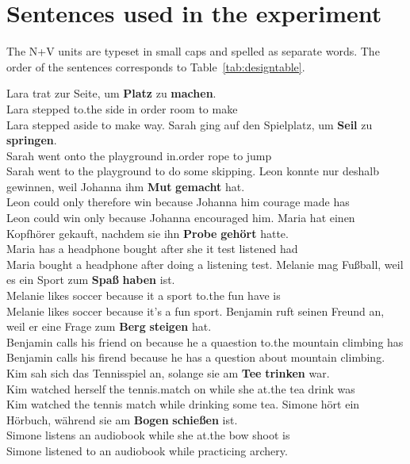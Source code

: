 \documentclass[biblatex, charis, linguex]{glossa}\usepackage{knitr}
\begin{document}


\appendix


\section{Sentences used in the experiment}
\label{sec:sentencesusedintheexperiment}

The N+V units are typeset in small caps and spelled as separate words.
The order of the sentences corresponds to Table~\ref{tab:designtable}.

\begin{exe}
  \ex\gll Lara trat zur Seite, um \textbf{Platz} zu \textbf{machen}.\\
  Lara stepped {to.the} side {in order} room to make\\
  \trans Lara stepped aside to make way.
  \ex\gll Sarah ging auf den Spielplatz, um \textbf{Seil} zu \textbf{springen}.\\
  Sarah went onto the playground {in.order} rope to jump\\
  \trans Sarah went to the playground to do some skipping.
  \ex\gll Leon konnte nur deshalb gewinnen, weil Johanna ihm \textbf{Mut} \textbf{gemacht} hat.\\
  Leon could only therefore win because Johanna him courage made has\\
  \trans Leon could win only because Johanna encouraged him.
  \ex\gll Maria hat einen Kopfhörer gekauft, nachdem sie ihn \textbf{Probe} \textbf{gehört} hatte.\\
  Maria has a headphone bought after she it test listened had\\
  \trans Maria bought a headphone after doing a listening test.
  \ex\gll Melanie mag Fußball, weil es ein Sport zum \textbf{Spaß} \textbf{haben} ist.\\
  Melanie likes soccer because it a sport {to.the} fun have is\\
  \trans Melanie likes soccer because it's a fun sport.
  \ex\gll Benjamin ruft seinen Freund an, weil er eine Frage zum \textbf{Berg} \textbf{steigen} hat.\\
  Benjamin calls his friend on because he a quaestion {to.the} mountain climbing has\\
  \trans Benjamin calls his firend because he has a question about mountain climbing.
  \ex\gll Kim sah sich das Tennisspiel an, solange sie am \textbf{Tee} \textbf{trinken} war.\\
  Kim watched herself the {tennis.match} on while she {at.the} tea drink was\\
  \trans Kim watched the tennis match while drinking some tea.
  \ex\gll Simone hört ein Hörbuch, während sie am \textbf{Bogen} \textbf{schießen} ist.\\
  Simone listens an audiobook while she {at.the} bow shoot is\\
  \trans Simone listened to an audiobook while practicing archery.
\end{exe}
\end{document}
